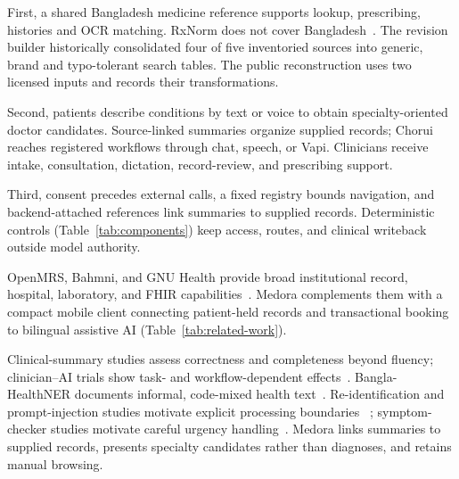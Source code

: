 \documentclass[preprint,12pt,a4paper]{elsarticle}
\begin{document}
First, a shared Bangladesh medicine reference supports lookup, prescribing, histories
and OCR matching. RxNorm does not cover Bangladesh~\cite{rxnorm}. The revision builder
historically consolidated four of five inventoried sources into generic, brand and typo-tolerant
search tables. The public reconstruction uses two licensed inputs and records their transformations.


Second, patients describe conditions by text or voice to obtain specialty-oriented
doctor candidates. Source-linked summaries organize supplied records; Chorui reaches
registered workflows through chat, speech, or Vapi. Clinicians receive intake, consultation,
dictation, record-review, and prescribing support.

Third, consent precedes external calls, a fixed registry bounds navigation, and
backend-attached references link summaries to supplied records. Deterministic controls
(Table~\ref{tab:components}) keep access, routes, and clinical writeback outside model authority.


OpenMRS, Bahmni, and GNU Health provide broad institutional record, hospital, laboratory,
and FHIR capabilities~\cite{openmrs,bahmni,gnuhealth}. Medora complements them with a
compact mobile client connecting patient-held records and transactional booking to
bilingual assistive AI (Table~\ref{tab:related-work}).

Clinical-summary studies assess correctness and completeness beyond fluency; clinician--AI
trials show task- and workflow-dependent effects~\cite{shing2021,tracsum,zhang2024clinicalsummary,goh2025gpt4assistance}.
Bangla-HealthNER documents informal, code-mixed health text~\cite{khan2023banglahealthner}.
Re-identification and prompt-injection studies motivate explicit processing boundaries
~\cite{campion2025diri,yang2025adversarial}; symptom-checker studies motivate careful urgency
handling~\cite{wallace2022}. Medora links summaries to supplied records, presents specialty
candidates rather than diagnoses, and retains manual browsing.
\end{document}

